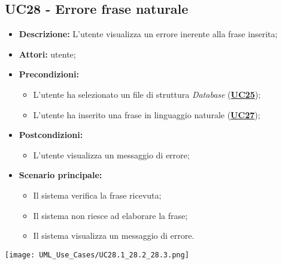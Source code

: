 \subsection{UC28 - Errore frase naturale}
\label{sec:UC28}
\begin{itemize}
	\item \textbf{Descrizione:} L’utente visualizza un errore inerente alla frase inserita;
	\item \textbf{Attori:} utente;
	\item \textbf{Precondizioni:} 
	\begin{itemize}
		\item L’utente ha selezionato un file di struttura \textit{Database} (\hyperref[sec:UC25]{\textbf{UC25}});
		\item L'utente ha inserito una frase in linguaggio naturale (\hyperref[sec:UC27]{\textbf{UC27}});
	\end{itemize}
	\item \textbf{Postcondizioni:} 
	\begin{itemize}
		\item L’utente visualizza un messaggio di errore;
	\end{itemize}
	\item \textbf{Scenario principale:} 
	\begin{itemize}
		\item Il sistema verifica la frase ricevuta;
		\item Il sistema non riesce ad elaborare la frase;
		\item Il sistema visualizza un messaggio di errore.
	\end{itemize}
\end{itemize}

\texttt{[image: UML\_Use\_Cases/UC28.1\_28.2\_28.3.png]}

